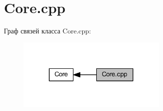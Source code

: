 \hypertarget{group__corecpp}{}\section{Core.\+cpp}
\label{group__corecpp}
Граф связей класса Core.\+cpp\+:\nopagebreak
\begin{figure}[H]
\begin{center}
\leavevmode
\includegraphics[width=209pt]{group__corecpp}
\end{center}
\end{figure}
